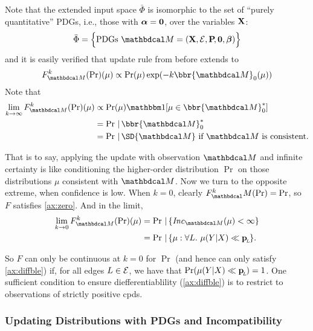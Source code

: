 \documentclass{article}
\begin{document}
Note that the extended input space $\bar \Phi$ is isomorphic to the set of ``purely quantitative'' PDGs, i.e., those with $\boldsymbol\alpha = \mathbf{0}$, over the variables $\mathbf{X}$: $$
	\bar\Phi = \Big\{ \text{PDGs}~\dg M = (\mat X, \Ed, \bP[], \mat0, \bbeta) \Big\}
$$
and it is easily verified that update rule from before extends to
\[
	F_{\dg M}^k(\Pr)(\mu) \propto \Pr(\mu) \exp(- k \bbr{\dg M}_0(\mu))
\]
Note that
\begin{align*}
	\lim_{k \to \infty} F_{\dg M}^k(\Pr)(\mu) &\propto
		\Pr(\mu) \mathbbm1[\mu \in {\bbr{\dg M}^*_0}] \\
		&= \Pr \,|\, \bbr{\dg M}^*_0 \\
		&= \Pr \,|\, \SD{\dg M} \text{~if $\dg M$ is consistent.}
\end{align*}

That is to say, applying the update with observation $\dg M$ and infinite certainty is like conditioning the higher-order distribution $\Pr$ on those distributions $\mu$ consistent with $\dg M$.
Now we turn to the opposite extreme, when confidence is low. When $k=0$, clearly $F^k_\dg M(\Pr) = \Pr$, so $F$ satisfies \cref{ax:zero}. And in the limit,
\begin{align*}
	\lim_{k \to 0} F_{\dg M}^k(\Pr)(\mu) &= \Pr \,|\, \{ \Inc_{\dg M}(\mu) < \infty \} \\
		&= \Pr \,|\, \{\mu : \forall L.~\mu(Y|X) \ll \bp \}.
\end{align*}

So $F$ can only be continuous at $k=0$ for $\Pr$ (and hence can only satisfy \cref{ax:diffble}) if, for all edges $L \in \mathcal E$, we have that $\Pr(\mu(Y|X) \ll \mathbf{p}_{\!_{L}\!}) = 1$.
One sufficient condition to ensure diefferentiablility (\cref{ax:diffble}) is to restrict to observations of strictly positive cpds.


\subsubsection{Updating Distributions with PDGs and Incompatibility}
\def\tauur{\mathtt{CPD\_UR}}
\end{document}
